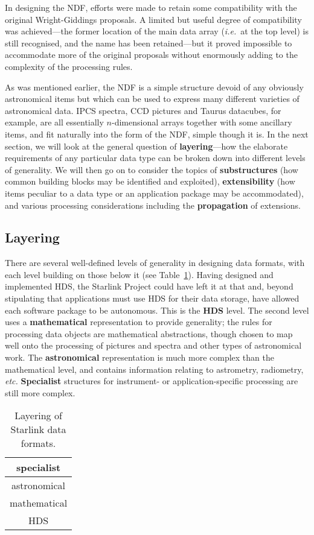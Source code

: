 \documentclass[twoside,11pt,nolof,noabs]{starlink}
\begin{document}
In designing the NDF, efforts were made
to retain some compatibility
with the original Wright-Giddings proposals.  A limited but
useful degree of compatibility was achieved---the former
location of the main data array (\textit{i.e.}\ at the top level) is
still recognised, and the name has been
retained---but it proved impossible to accommodate more
of the original proposals without enormously
adding to the complexity of the processing rules.

As was mentioned earlier, the NDF is a simple structure devoid
of any obviously astronomical items but which can be used
to express many different varieties of astronomical
data.  IPCS spectra, CCD pictures and Taurus datacubes, for example,
are all essentially $n$-dimensional arrays together with
some ancillary items, and fit naturally into the
form of the NDF, simple though it is.
In the next section, we will look at the
general question of \textbf{layering}---how the
elaborate requirements of any particular data type can
be broken down into different levels of generality.  We
will then go on to consider
the topics of \textbf{substructures} (how
common building blocks may be identified and exploited),
\textbf{extensibility} (how items peculiar to a data type
or an application package may be accommodated), and
various processing considerations including the
\textbf{propagation} of extensions.

\subsection*{Layering}
There are several well-defined levels of generality in designing
data formats, with each level building on those below it (see
Table~\ref{ta:layering}).  Having designed and implemented
HDS, the Starlink Project could have left it at that and,
beyond stipulating that applications must use HDS for their
data storage, have allowed each software package
to be autonomous.
This is the \textbf{HDS} level.
The second level uses a \textbf{mathematical}
representation to provide generality;  the rules for processing data
objects are mathematical abstractions, though chosen to map
well onto the processing of pictures and spectra and other
types of astronomical work.  The \textbf{astronomical}
representation is much more complex than the mathematical level,
and contains information relating to astrometry, radiometry,
\textit{etc.}
\textbf{Specialist} structures for instrument- or application-specific
processing are still more complex.

\begin{table}
\centering
\caption{Layering of Starlink data formats.}
\label{ta:layering}
\begin{center}
\begin{tabular}{|c|}
\hline
specialist \\ \hline
astronomical \\ \hline
mathematical \\ \hline
HDS \\ \hline
\end{tabular}
\end{center}
\end{table}
\medskip
\end{document}
